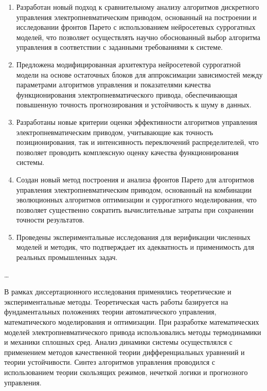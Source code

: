 {\novelty}
\begin{enumerate}[beginpenalty=10000] %
    \item Разработан новый подход к сравнительному анализу алгоритмов дискретного управления
    электропневматическим приводом, основанный на построении и исследовании фронтов Парето с
    использованием нейросетевых суррогатных моделей, что позволяет осуществлять научно
    обоснованный выбор алгоритма управления в соответствии с заданными требованиями к системе.

    \item Предложена модифицированная архитектура нейросетевой суррогатной модели на основе
    остаточных блоков для аппроксимации зависимостей между
    параметрами алгоритмов управления и показателями качества функционирования
    электропневматического привода, обеспечивающая повышенную точность
    прогнозирования и устойчивость к шуму в данных.

    \item Разработаны новые критерии оценки эффективности алгоритмов управления
    электропневматическим приводом, учитывающие как точность позиционирования, так
    и интенсивность переключений распределителей, что позволяет
    проводить комплексную оценку качества функционирования системы.

    \item Создан новый метод построения и анализа фронтов Парето для алгоритмов
    управления электропневматическим приводом, основанный на комбинации эволюционных
    алгоритмов оптимизации и суррогатного моделирования, что позволяет существенно сократить
    вычислительные затраты при сохранении точности результатов.

    \item Проведены экспериментальные исследования для верификации численных моделей и методик,
    что подтверждает их адекватность и применимость для реальных промышленных задач.
\end{enumerate}

{\influence} \ldots

{\methods} В рамках диссертационного исследования применялись теоретические и экспериментальные методы.
Теоретическая часть работы базируется на фундаментальных положениях теории автоматического 
управления, математического моделирования и оптимизации. При разработке математических моделей
электропневматического привода использовались методы термодинамики и механики сплошных
сред. Анализ динамики системы осуществлялся с применением методов качественной теории 
дифференциальных уравнений и теории устойчивости. Синтез алгоритмов управления проводился
с использованием теории скользящих режимов, нечеткой логики и прогнозного управления.


